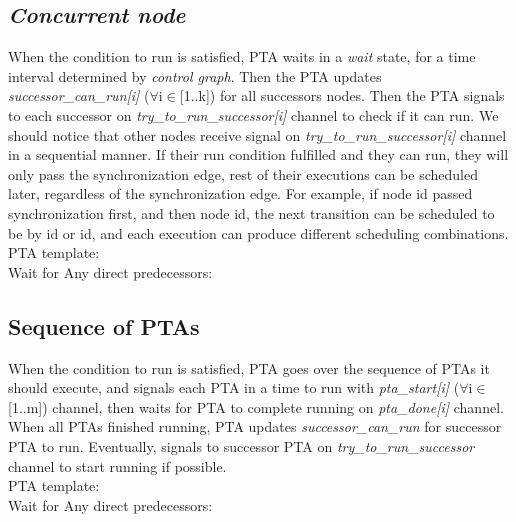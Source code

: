 \subsection{\textit{Concurrent node}}
When the condition to run is satisfied, PTA waits in a \textcolor{ColorUppaalState}{\textit{wait}} state, for a time interval determined by \textit{control graph}. Then the PTA updates \textcolor{ColorEdgeGuard}{\textit{successor_can_run[i]}} ($\forall$i$\in$[1..k]) for all successors nodes. Then the PTA signals to each successor on \textcolor{ColorUppaalChannel}{\textit{try_to_run_successor[i]}} channel to check if it can run. We should notice that other nodes receive signal on \textcolor{ColorUppaalChannel}{\textit{try_to_run_successor[i]}} channel in a sequential manner. If their run condition fulfilled and they can run, they will only pass the synchronization edge, rest of their executions can be scheduled later, regardless of the synchronization edge. For example, if node id passed synchronization first, and then node id, the next transition can be scheduled to be by id or id, and each execution can produce different scheduling combinations.\\
PTA template:\\
{Wait for Any direct predecessors: }{} \clearpage
\subsection{Sequence of PTAs}
When the condition to run is satisfied, PTA goes over the sequence of PTAs it should execute, and signals each PTA in a time to run with \textcolor{ColorUppaalChannel}{\textit{pta_start[i]}} ($\forall$i$\in$[1..m]) channel, then waits for PTA to complete running on \textcolor{ColorUppaalChannel}{\textit{pta_done[i]}} channel. When all PTAs finished running, PTA updates \textcolor{ColorEdgeGuard}{\textit{successor_can_run}} for successor PTA to run. Eventually, signals to successor PTA on \textcolor{ColorUppaalChannel}{\textit{try_to_run_successor}} channel to start running if possible.\\
PTA template:\\
 {Wait for Any direct predecessors: }{} \clearpage
